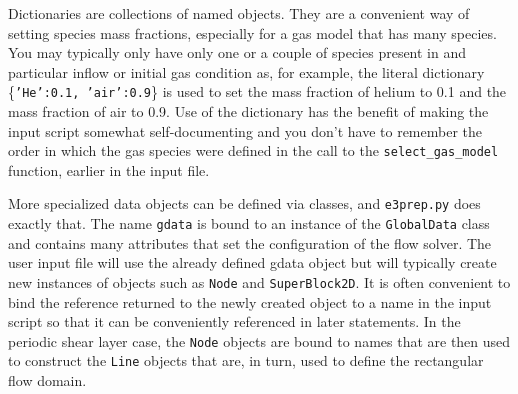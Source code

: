 \documentclass[12pt,a4paper,twoside]{article}
\begin{document}
\medskip
Dictionaries are collections of named objects.
They are a convenient way of setting species mass fractions, especially for a gas model
that has many species.
You may typically only have only one or a couple of species present in and particular inflow or 
initial gas condition as, for example, the literal dictionary \{\texttt{'He':0.1, 'air':0.9}\}
is used to set the mass fraction of helium to 0.1 and the mass fraction of air to 0.9.
Use of the dictionary has the benefit of making the input script somewhat self-documenting and you
don't have to remember the order in which the gas species were defined in the call 
to the \texttt{select\_gas\_model} function, earlier in the input file.

\medskip
More specialized data objects can be defined via classes, and \texttt{e3prep.py} does exactly that.
The name \texttt{gdata} is bound to an instance of the \texttt{GlobalData} class and contains
many attributes that set the configuration of the flow solver.
The user input file will use the already defined gdata object but will typically create new instances
of objects such as \texttt{Node} and \texttt{SuperBlock2D}.
It is often convenient to bind the reference returned to the newly created object to a name in the input script
so that it can be conveniently referenced in later statements.
In the periodic shear layer case, the \texttt{Node} objects are bound to names 
that are then used to construct the \texttt{Line} objects that are, in turn, 
used to define the rectangular flow domain.
\end{document}
